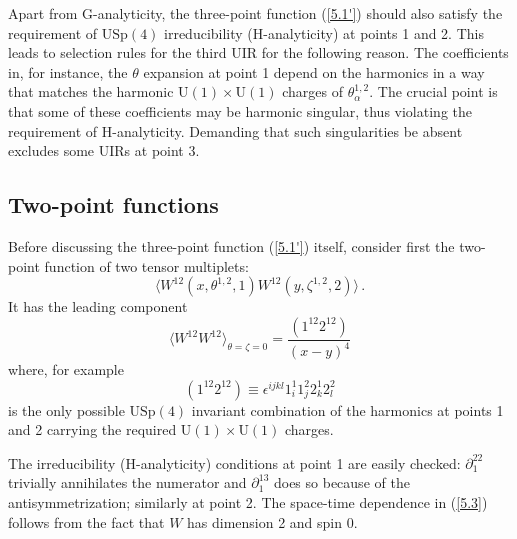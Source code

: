 \documentclass[a4paper,11pt]{article}
\begin{document}
Apart from G-analyticity, the  three-point function (\ref{5.1'}) should also
satisfy the requirement of $\mbox{USp}(4)$ irreducibility (H-analyticity) at
points 1 and 2. This leads to selection rules for the third UIR for the
following reason. The coefficients in, for instance, the $\theta$ expansion
at point 1
depend on the harmonics in a way that matches the harmonic $\mbox{U}(1) \times
\mbox{U}(1)$ charges of $\theta^{1,2}_\alpha$. The crucial point is that some
of these coefficients may be harmonic singular, thus violating the requirement
of H-analyticity. Demanding that such singularities be absent excludes some
UIRs at point 3.



\subsection{Two-point functions}

Before discussing the three-point function (\ref{5.1'}) itself, consider first
the two-point function of two tensor multiplets:
\begin{equation}\label{5.101}
  \langle W^{12}(x,\theta^{1,2},1)
  W^{12}(y,\zeta^{1,2},2) \rangle \, .
\end{equation}
It has the leading component
\begin{equation}\label{5.3}
  \langle W^{12} W^{12}\rangle_{\theta=\zeta=0} = \frac{(1^{12}2^{12})}{(x-y)^4}
\end{equation}
where, for example
\begin{equation}\label{5.4}
  (1^{12}2^{12}) \equiv \epsilon^{ijkl} 1^1_i 1^2_j 2^1_k 2^2_l
\end{equation}
is the only possible $\mbox{USp}(4)$ invariant combination of the harmonics at
points 1 and 2 carrying the required $\mbox{U}(1) \times \mbox{U}(1)$ charges.

The irreducibility (H-analyticity) conditions at point 1 are easily checked:
$\partial^{22}_1$ trivially annihilates the numerator and $\partial^{13}_1$
does so because of the antisymmetrization; similarly at point 2. The space-time
dependence in (\ref{5.3}) follows from the fact that $W$ has dimension 2 and
spin 0.
\end{document}

